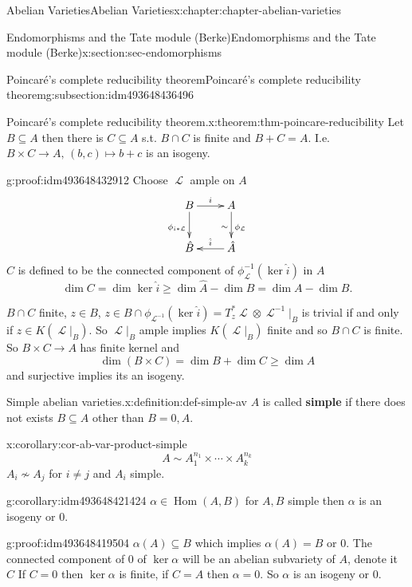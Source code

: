 \documentclass[oneside,10pt,]{book}
\newcommand{\terminology}[1]{\textbf{#1}}
\numberwithin{equation}{section}
\newcommand{\sheaf}[1]{\operatorname{\mathcal{#1}}}
\DeclareMathOperator{\Hom}{Hom}
\begin{document}
\begin{chapterptx}{Abelian Varieties}{}{Abelian Varieties}{}{}{x:chapter:chapter-abelian-varieties}
\begin{sectionptx}{Endomorphisms and the Tate module (Berke)}{}{Endomorphisms and the Tate module (Berke)}{}{}{x:section:sec-endomorphisms}
\begin{subsectionptx}{Poincaré's complete reducibility theorem}{}{Poincaré's complete reducibility theorem}{}{}{g:subsection:idm493648436496}
\begin{theorem}{Poincaré's complete reducibility theorem.}{}{x:theorem:thm-poincare-reducibility}
Let \(B\subseteq A\) then there is \(C\subseteq A\) s.t. \(B \cap C\) is finite and \(B+C = A\). I.e. \(B\times C \to A,\,(b,c) \mapsto b+c\) is an isogeny.%
\end{theorem}
\begin{proofptx}{}{g:proof:idm493648432912}
Choose \(\sheaf L\) ample on \(A\)%
\begin{equation*}
\xymatrix{
B\ar[r]^i \ar[d]_{\phi_{i*\sheaf L}} & A \ar[d]_\sim^{\phi_{\sheaf L}} \\
\hat B & \hat A \ar[l]_{\hat i}
}
\end{equation*}
\(C\) is defined to be the connected component of \(\phi^{-1}_{\sheaf L}(\ker \hat i)\) in \(A\)%
\begin{equation*}
\dim C = \dim \ker \hat i \ge \dim \hat A - \dim \hat B = \dim A - \dim B\text{.}
\end{equation*}
%
\par
\(B \cap C\) finite, \(z\in B\), \(z\in B\cap \phi_{\sheaf L^{-1}} (\ker \hat i) = T_z^* \sheaf L \otimes \sheaf L^{-1} |_B\) is trivial if and only if \(z\in K(\sheaf L|_B)\). So \(\sheaf L|_B\) ample implies \(K(\sheaf L|_B)\) finite and so \(B\cap C\) is finite. So \(B\times C \to A\) has finite kernel and%
\begin{equation*}
\dim (B\times C) = \dim B + \dim C \ge \dim A
\end{equation*}
and surjective implies its an isogeny.%
\end{proofptx}
\begin{definition}{Simple abelian varieties.}{x:definition:def-simple-av}%
\(A\) is called \terminology{simple} if there does not exists \(B\subseteq A\) other than \(B = 0,A\).%
\end{definition}
\begin{corollary}{}{}{x:corollary:cor-ab-var-product-simple}%
%
\begin{equation*}
A \sim A_1^{n_1} \times \cdots \times A_k^{n_k}
\end{equation*}
\(A_i \not\sim A_j\) for \(i\ne j\) and \(A_i\) simple.%
\end{corollary}
\begin{corollary}{}{}{g:corollary:idm493648421424}%
\(\alpha \in \Hom(A,B)\) for \(A,B\) simple then \(\alpha\) is an isogeny or \(0\).%
\end{corollary}
\begin{proofptx}{}{g:proof:idm493648419504}
\(\alpha(A) \subseteq B\) which implies \(\alpha(A)  = B\) or \(0\). The connected component of 0 of \(\ker \alpha\) will be an abelian subvariety of \(A\), denote it \(C\) If \(C = 0\) then \(\ker \alpha\) is finite, if \(C = A\) then \(\alpha = 0\). So \(\alpha\) is an isogeny or \(0\).%

\end{proofptx}
\end{subsectionptx}
\end{sectionptx}
\end{chapterptx}
\end{document}
